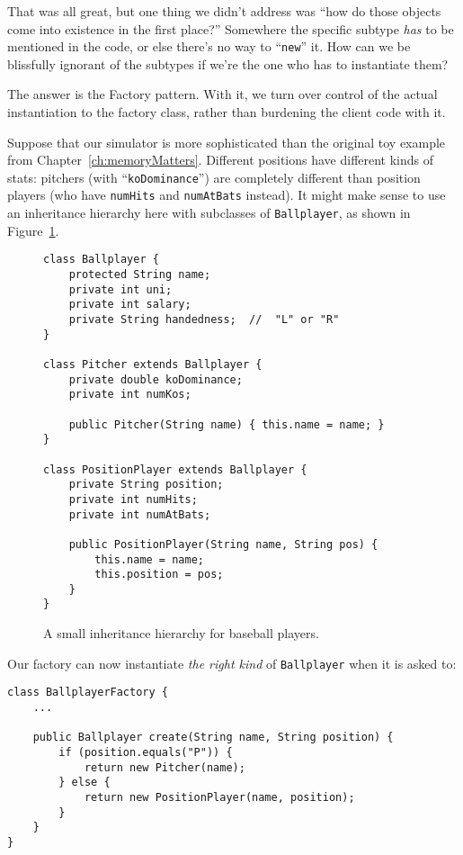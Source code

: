 That was all great, but one thing we didn't address was ``how do those objects
come into existence in the first place?'' Somewhere the specific subtype
\textit{has} to be mentioned in the code, or else there's no way to
``\texttt{new}'' it. How can we be blissfully ignorant of the subtypes if we're
the one who has to instantiate them?

The answer is the Factory pattern. With it, we turn over control of the actual
instantiation to the factory class, rather than burdening the client code with
it.

Suppose that our simulator is more sophisticated than the original toy example
from Chapter~\ref{ch:memoryMatters}. Different positions have different kinds
of stats: pitchers (with ``\texttt{koDominance}'') are completely different
than position players (who have \texttt{numHits} and \texttt{numAtBats}
instead). It might make sense to use an inheritance hierarchy here with
subclasses of \texttt{Ballplayer}, as shown in
Figure~\ref{ballplayerInheritance}.

\begin{figure}[ht]
\begin{Verbatim}[fontsize=\small,samepage=true,frame=single]
class Ballplayer {
    protected String name;
    private int uni;
    private int salary;
    private String handedness;  //  "L" or "R"
}

class Pitcher extends Ballplayer {
    private double koDominance;
    private int numKos;

    public Pitcher(String name) { this.name = name; }
}

class PositionPlayer extends Ballplayer {
    private String position;
    private int numHits;
    private int numAtBats;

    public PositionPlayer(String name, String pos) {
        this.name = name;
        this.position = pos;
    }
}
\end{Verbatim}
\caption{A small inheritance hierarchy for baseball players.}
\label{ballplayerInheritance}
\end{figure}

Our factory can now instantiate \textit{the right kind} of \texttt{Ballplayer}
when it is asked to:

\begin{Verbatim}[fontsize=\small,samepage=true,frame=single]
class BallplayerFactory {
    ...

    public Ballplayer create(String name, String position) {
        if (position.equals("P")) {
            return new Pitcher(name);
        } else {
            return new PositionPlayer(name, position);
        }
    }
}
\end{Verbatim}

